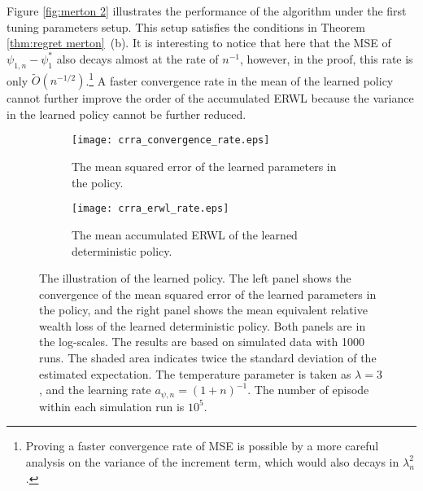 Figure \ref{fig:merton 2} illustrates the performance of the algorithm under the first tuning parameters setup. This setup satisfies the conditions in Theorem \ref{thm:regret merton}~(b). It is interesting to notice that here that the MSE of $\psi_{1,n} - \psi_1^*$ also decays almost at the rate of $n^{-1}$, however, in the proof, this rate is only $\tilde{O}(n^{-1/2})$.\footnote{Proving a faster convergence rate of MSE is possible by a more careful analysis on the variance of the increment term, which would also decays in $\lambda_n^2$.} A faster convergence rate in the mean of the learned policy cannot further improve the order of the accumulated ERWL because the variance in the learned policy cannot be further reduced.  

\begin{figure}[htbp]
	\centering
	\begin{subfigure}{0.47\textwidth}
		\texttt{[image: crra\_convergence\_rate.eps]}
		\caption{The mean squared error of the learned parameters in the policy.}
	\end{subfigure}
	\begin{subfigure}{0.47\textwidth}
		\texttt{[image: crra\_erwl\_rate.eps]}
		\caption{The mean accumulated ERWL of the learned deterministic policy.}
	\end{subfigure}
	\caption{The illustration of the learned policy. The left panel shows the convergence of the mean squared error of the learned parameters in the policy, and the right panel shows the mean equivalent relative wealth loss of the learned deterministic policy. Both panels are in the log-scales. The results are based on simulated data with 1000 runs. The shaded area indicates twice the standard deviation of the estimated expectation. The temperature parameter is taken as $\lambda=3$, and the learning rate $a_{\psi, n} = (1+n)^{-1}$. The number of episode within each simulation run is $10^5$.}
	\label{fig:merton 1}
\end{figure}



